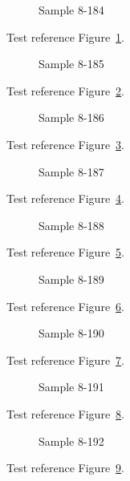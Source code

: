 \begin{figure}[tbhp]
\caption{Sample 8-184}
\label{fig:sample-8-184}
\end{figure}

Test reference Figure~\ref{fig:sample-8-184}.

\begin{figure}[tbhp]
\caption{Sample 8-185}
\label{fig:sample-8-185}
\end{figure}

Test reference Figure~\ref{fig:sample-8-185}.

\begin{figure}[tbhp]
\caption{Sample 8-186}
\label{fig:sample-8-186}
\end{figure}

Test reference Figure~\ref{fig:sample-8-186}.

\begin{figure}[tbhp]
\caption{Sample 8-187}
\label{fig:sample-8-187}
\end{figure}

Test reference Figure~\ref{fig:sample-8-187}.

\begin{figure}[tbhp]
\caption{Sample 8-188}
\label{fig:sample-8-188}
\end{figure}

Test reference Figure~\ref{fig:sample-8-188}.

\begin{figure}[tbhp]
\caption{Sample 8-189}
\label{fig:sample-8-189}
\end{figure}

Test reference Figure~\ref{fig:sample-8-189}.

\begin{figure}[tbhp]
\caption{Sample 8-190}
\label{fig:sample-8-190}
\end{figure}

Test reference Figure~\ref{fig:sample-8-190}.

\begin{figure}[tbhp]
\caption{Sample 8-191}
\label{fig:sample-8-191}
\end{figure}

Test reference Figure~\ref{fig:sample-8-191}.

\begin{figure}[tbhp]
\caption{Sample 8-192}
\label{fig:sample-8-192}
\end{figure}

Test reference Figure~\ref{fig:sample-8-192}.

